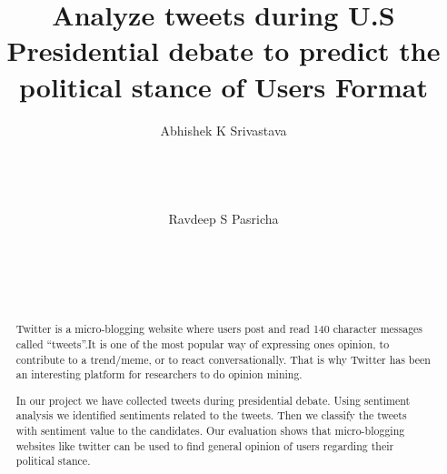 \documentclass{acm_proc_article-sp}
\begin{document}
\title{ Analyze tweets during U.S Presidential debate to predict the political stance of Users
Format}


\author{
%
%
\alignauthor
Abhishek K Srivastava \\
       \\
       \\
       \\
       \\
\alignauthor
Ravdeep S Pasricha \\
       \\
       \\
       \\
       \\
}
\maketitle
\begin{abstract}
Twitter is a micro-blogging website where users post and read 140 character messages called ``tweets''.It is one of the most popular way of expressing ones opinion, to contribute to a trend/meme, or to react conversationally. That is why Twitter has been an interesting platform for researchers to do opinion mining.

In our project we have collected tweets during presidential debate. Using sentiment analysis we identified sentiments related to the tweets. Then we classify the tweets with sentiment value to the candidates. Our evaluation shows that micro-blogging websites like twitter can be used to find general opinion of users regarding their political stance.

\end{abstract}
\end{document}
